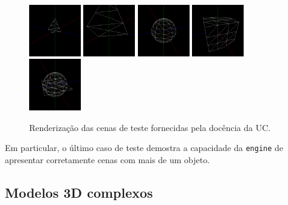 \documentclass[12pt, a4paper]{article}
\begin{document}
\begin{figure}[H]
    \begin{adjustwidth}{-2cm}{-2cm} %
        \centering
        \includegraphics[width=0.20\textwidth]{res/results/Test1.png}
        \includegraphics[width=0.20\textwidth]{res/results/Test2.png}
        \includegraphics[width=0.20\textwidth]{res/results/Test3.png}
        \includegraphics[width=0.20\textwidth]{res/results/Test4.png}
        \includegraphics[width=0.20\textwidth]{res/results/Test5.png}
        \caption{Renderização das cenas de teste fornecidas pela docência da UC.}
    \end{adjustwidth}
\end{figure}

Em particular, o último caso de teste demostra a capacidade da \texttt{engine} de apresentar
corretamente cenas com mais de um objeto.

\subsection{Modelos 3D complexos}
\end{document}

